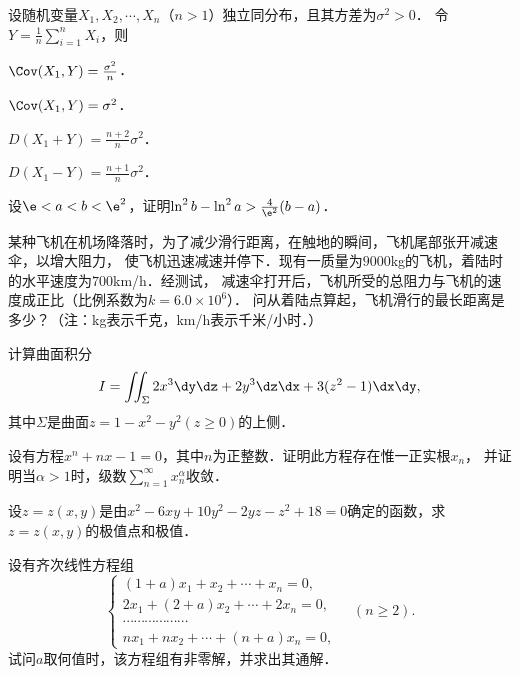 \documentclass[plain,noanswer,medmath]{../../template/jnuexam}
\begin{document}
\begin{problem}
设随机变量$X_1,X_2, \cdots ,X_n$（$n > 1$）独立同分布，且其方差为$\sigma^2 > 0$．
令$Y = \frac{1}{n}\sum_{i = 1}^n X_i$，则\pickout{}
\begin{abcd}
\item $\Cov (X_1,Y) = \frac{\sigma^2}{n}$．
\item $\Cov (X_1,Y) = \sigma^2$．
\item $D(X_1 + Y) = \frac{n + 2}{n} \sigma^2$．
\item $D(X_1 - Y) = \frac{n + 1}{n} \sigma^2$．
\end{abcd}
\end{problem}




\begin{problem}[points=12]
设$\e < a < b < \e^2$，证明$\ln^2 b - \ln^2 a > \frac{4}{\e^2}(b - a)$．
\end{problem}


\begin{problem}[points=11]
某种飞机在机场降落时，为了减少滑行距离，在触地的瞬间，飞机尾部张开减速伞，以增大阻力，
使飞机迅速减速并停下．现有一质量为$9000$kg的飞机，着陆时的水平速度为$700$km/h．经测试，
减速伞打开后，飞机所受的总阻力与飞机的速度成正比（比例系数为$k = 6.0 \times 10^6$）．
问从着陆点算起，飞机滑行的最长距离是多少？（注：kg表示千克，km/h表示千米/小时．）
\end{problem}


\begin{problem}[points=12]
计算曲面积分
$$I = \iint_{\Sigma}2x^3 \dy\dz + 2y^3 \dz\dx + 3(z^2 - 1) \dx\dy,$$
其中$\Sigma$是曲面$z = 1 - x^2 - y^2(z \ge 0)$的上侧．
\end{problem}


\begin{problem}[points=11]
设有方程$x^n + nx - 1 = 0$，其中$n$为正整数．证明此方程存在惟一正实根$x_n$，
并证明当$\alpha > 1$时，级数$\sum_{n = 1}^{\infty}x_n^{\alpha}$收敛．
\end{problem}


\begin{problem}[points=12]
设$z = z(x,y)$是由$x^2 - 6xy + 10y^2 - 2yz - z^2 + 18 = 0$确定的函数，求$z = z(x,y)$的极值点和极值．
\end{problem}


\begin{problem}[points=9]
设有齐次线性方程组
$$\begin{cases}
  (1 + a) x_1 + x_2 + \cdots + x_n = 0, \\
  2x_1 + (2 + a) x_2 + \cdots + 2x_n = 0, \\
  \cdots \cdots \cdots \cdots \cdots \cdots \\
  nx_1 + nx_2 + \cdots + (n + a) x_n = 0,
\end{cases}\quad(n \ge 2).$$
试问$a$取何值时，该方程组有非零解，并求出其通解．
\end{problem}
\end{document}
